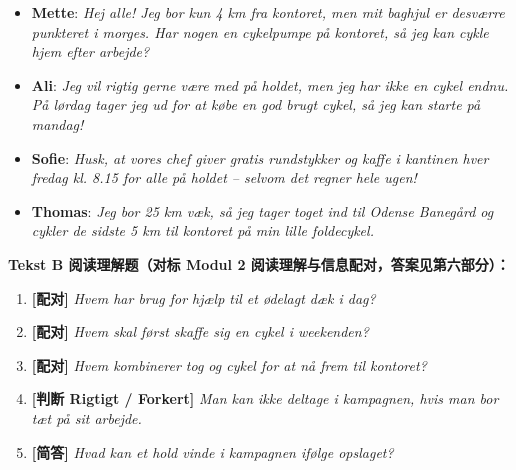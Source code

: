 \begin{tcolorbox}[enhanced, breakable, colback=NCDBgBlue, colframe=NCDNavy, coltitle=white, fonttitle=\bfseries, title={公司内网工作群消息（4 条同事留言）}, arc=2pt, boxrule=0.8pt, left=10pt, right=10pt, top=7pt, bottom=7pt]
\small
\begin{itemize}
  \item \textbf{Mette}: \textit{Hej alle! Jeg bor kun 4 km fra kontoret, men mit baghjul er desværre punkteret i morges. Har nogen en cykelpumpe på kontoret, så jeg kan cykle hjem efter arbejde?}
  \item \textbf{Ali}: \textit{Jeg vil rigtig gerne være med på holdet, men jeg har ikke en cykel endnu. På lørdag tager jeg ud for at købe en god brugt cykel, så jeg kan starte på mandag!}
  \item \textbf{Sofie}: \textit{Husk, at vores chef giver gratis rundstykker og kaffe i kantinen hver fredag kl. 8.15 for alle på holdet -- selvom det regner hele ugen!}
  \item \textbf{Thomas}: \textit{Jeg bor 25 km væk, så jeg tager toget ind til Odense Banegård og cykler de sidste 5 km til kontoret på min lille foldecykel.}
\end{itemize}
\end{tcolorbox}

\textbf{Tekst B 阅读理解题（对标 Modul 2 阅读理解与信息配对，答案见第六部分）：}
\begin{enumerate}
  \item \textbf{[配对]} \textit{Hvem har brug for hjælp til et ødelagt dæk i dag?} \underline{\hspace{2.2cm}}
  \item \textbf{[配对]} \textit{Hvem skal først skaffe sig en cykel i weekenden?} \underline{\hspace{2.2cm}}
  \item \textbf{[配对]} \textit{Hvem kombinerer tog og cykel for at nå frem til kontoret?} \underline{\hspace{2.2cm}}
  \item \textbf{[判断 Rigtigt / Forkert]} \textit{Man kan ikke deltage i kampagnen, hvis man bor tæt på sit arbejde.} \underline{\hspace{2.2cm}}
  \item \textbf{[简答]} \textit{Hvad kan et hold vinde i kampagnen ifølge opslaget?} \underline{\hspace{4.5cm}}
\end{enumerate}

